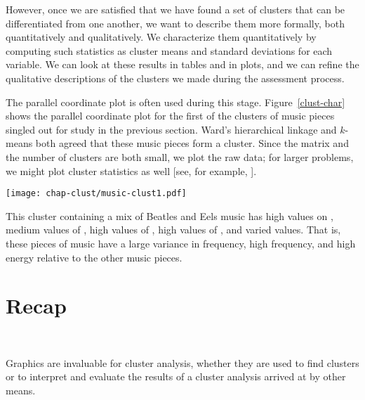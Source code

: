However, once we are satisfied that we have found a set of clusters
that can be differentiated from one another, we want to describe them
more formally, both quantitatively and qualitatively.  We characterize
them quantitatively by computing such statistics as cluster means and
standard deviations for each variable.  We can look at these results
in tables and in plots, and we can refine the qualitative descriptions
of the clusters we made during the assessment process.


The parallel coordinate plot is often used during this stage.
Figure~\ref{clust-char} shows the parallel coordinate plot for the
first of the clusters of music pieces singled out for study in the
previous section. Ward's hierarchical linkage and $k$-means both
agreed that these music pieces form a cluster.  Since the matrix and
the number of clusters are both small, we plot the raw data; for
larger problems, we might plot cluster statistics as well [see,
for example, ].

\begin{figure*}[htbp]
\begin{center}
  {\texttt{[image: chap-clust/music-clust1.pdf]}}
\end{center}
\caption[Characterizing clusters in a parallel coordinate
plot]{Characterizing clusters in a parallel coordinate plot.  The
highlighted profiles correspond to one cluster for which
Ward's hierarchical linkage and $k$-means were in agreement.  }
\label{clust-char}
\end{figure*}

This cluster containing a mix of Beatles and Eels music has high
values on , medium values of , high values of
, high values of , and varied 
values. That is, these pieces of music have a large variance in
frequency, high frequency, and high energy relative to the other
music pieces.

\section{Recap}~\label{clust-recap}


Graphics are invaluable for cluster analysis, whether they are used to
find clusters or to interpret and evaluate the results of a cluster
analysis arrived at by other means.

